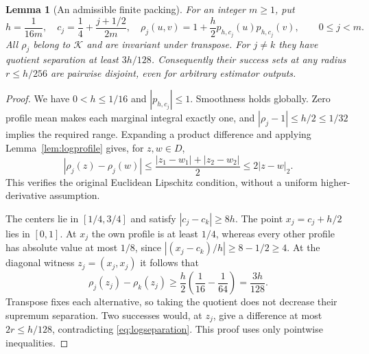 \documentclass[11pt]{article}
\newtheorem{lemma}[theorem]{Lemma}
\theoremstyle{remark}
\newcommand{\K}{\mathcal K}
\begin{document}
\begin{lemma}[An admissible finite packing]\label{lem:logpacking}
For an integer $m\ge1$, put
\begin{equation}\label{eq:logfamily}
 h=\frac1{16m},\quad c_j=\frac14+\frac{j+1/2}{2m},\quad
 \rho_j(u,v)=1+\frac h2 p_{h,c_j}(u)p_{h,c_j}(v),
 \qquad 0\le j<m.
\end{equation}
All $\rho_j$ belong to $\K$ and are invariant under transpose.
For $j\ne k$ they have quotient separation at least $3h/128$.
Consequently their success sets at any radius $r\le h/256$ are
pairwise disjoint, even for arbitrary estimator outputs.
\end{lemma}
\begin{proof}
We have $0<h\le1/16$ and $|p_{h,c_j}|\le1$. Smoothness holds
globally. Zero profile mean makes each marginal integral exactly one,
and $|\rho_j-1|\le h/2\le1/32$ implies the required range.
Expanding a product difference and applying Lemma~\ref{lem:logprofile}
gives, for $z,w\in D$,
\[
 |\rho_j(z)-\rho_j(w)|
 \le\frac{|z_1-w_1|+|z_2-w_2|}{2}\le2|z-w|_2.
\]
This verifies the original Euclidean Lipschitz condition, without
a uniform higher-derivative assumption.

The centers lie in $[1/4,3/4]$ and satisfy $|c_j-c_k|\ge8h$.
The point $x_j=c_j+h/2$ lies in $[0,1]$. At $x_j$ the own profile
is at least $1/4$, whereas every other profile has absolute value
at most $1/8$, since $|(x_j-c_k)/h|\ge8-1/2\ge4$.
At the diagonal witness $z_j=(x_j,x_j)$ it follows that
\begin{equation}\label{eq:logseparation}
 \rho_j(z_j)-\rho_k(z_j)
 \ge\frac h2\left(\frac1{16}-\frac1{64}\right)=\frac{3h}{128}.
\end{equation}
Transpose fixes each alternative, so taking the quotient does not
decrease their supremum separation. Two successes would, at $z_j$,
give a difference at most $2r\le h/128$, contradicting
\eqref{eq:logseparation}. This proof uses only pointwise inequalities.
\end{proof}
\end{document}
